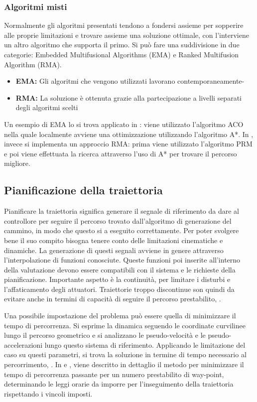 \subsubsection{Algoritmi misti}
Normalmente gli algoritmi presentati tendono a fondersi assieme per sopperire alle proprie limitazioni e trovare assieme una soluzione ottimale, con l'interviene un altro algoritmo che supporta il primo. Si può fare una suddivisione in due categorie: Embedded Multifusional Algorithms (EMA) e Ranked Multifusion Algorithm (RMA).
\begin{itemize}
	\item \textbf{EMA:} Gli algoritmi che vengono utilizzati lavorano contemporaneamente-
	\item \textbf{RMA:} La soluzione è ottenuta grazie alla partecipazione a livelli separati degli algoritmi scelti
\end{itemize}
Un esempio di EMA lo si trova applicato in \cite{SaberAhmedYousuf2008Sucb}: viene utilizzato l'algoritmo ACO nella quale localmente avviene una ottimizzazione utilizzando l'algoritmo A*.
In \cite{FeiYanYi-ShaLiuJi-ZhongXiao2013PPiC}, invece si implementa un approccio RMA: prima viene utilizzato l'algoritmo PRM e poi viene effettuata la ricerca attraverso l'uso di A* per trovare il percorso migliore.


\subsection{Pianificazione della traiettoria}
Pianificare la traiettoria significa generare il segnale di riferimento da dare al controllore per seguire il percorso trovato dall'algoritmo di generazione del cammino, in modo che questo si a eseguito correttamente. Per poter svolgere bene il suo compito bisogna tenere conto delle limitazioni cinematiche e dinamiche. La generazione di questi segnali avviene in genere attraverso l'interpolazione di funzioni conosciute. Queste funzioni poi inserite all'interno della valutazione devono essere compatibili con il sistema e le richieste della pianificazione.
Importante aspetto è la continuità, per limitare i disturbi e l'affaticamento degli attuatori. Traiettorie troppo discontinue son quindi da evitare anche in termini di capacità di seguire il percorso prestabilito, \cite{PathPlannigOverview}.

Una possibile impostazione del problema può essere quella di minimizzare il tempo di percorrenza. Si esprime la dinamica seguendo le coordinate curvilinee lungo il percorso geometrico e si analizzano le pseudo-velocità e le pseudo-accelerazioni lungo questo sistema di riferimento. Applicando le limitazione del caso su questi parametri, si trova la soluzione in termine di tempo necessario al percorrimento, \cite{PathPlannigOverview}. 
In \cite{BobrowJ.E2016TCoR} e \cite{HowieChoset2005PoRM}, viene descritto in dettaglio il metodo per minimizzare il tempo di percorrenza passante per un numero prestabilito di way-point, determinando le leggi orarie da imporre per l'inseguimento della traiettoria rispettando i vincoli imposti. 

